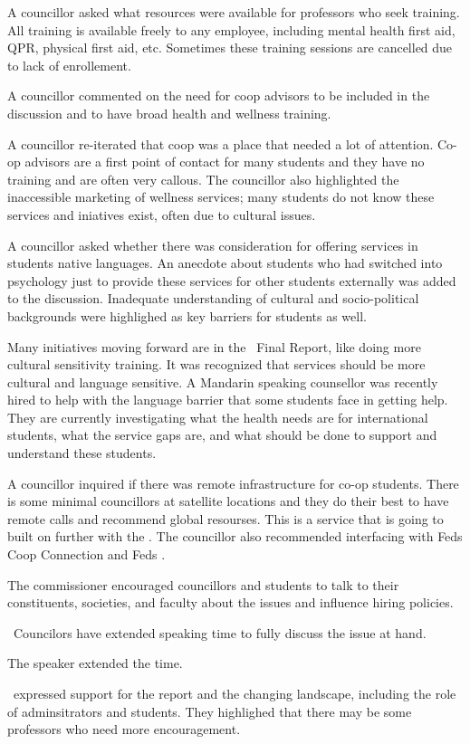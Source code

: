 \begin{information}
    A councillor asked what resources were available for professors who seek 
    training. All training is available freely to any employee, including
    mental health first aid, QPR, physical first aid, etc. Sometimes these 
    training sessions are cancelled due to lack of enrollement. 

    A councillor commented on the need for coop advisors to be included in 
    the discussion and to have broad health and wellness training. 

    A councillor re-iterated that coop was a place that needed a lot of
    attention. Co-op advisors are a first point of contact for many students
    and they have no training and are often very callous. The councillor also 
    highlighted the inaccessible marketing of wellness services; many students
    do not know these services and iniatives exist, often due to cultural
    issues.

    A councillor asked whether there was consideration for offering services in
    students native languages. An anecdote about students who had switched into
    psychology just to provide these services for other students externally was
    added to the discussion. Inadequate understanding of cultural and
    socio-political backgrounds were highlighed as key barriers for students as
    well. 

    Many initiatives moving forward are in the \pacsmh\ Final Report, like
    doing more cultural sensitivity training. It was recognized that services 
    should be more cultural and language sensitive. A Mandarin speaking
    counsellor was recently hired to help with the language barrier that some
    students face in getting help. They are currently investigating what the
    health needs are for international students, what the service gaps are,
    and what should be done to support and understand these students.

    A councillor inquired if there was remote infrastructure for co-op
    students. There is some minimal councillors at satellite locations and
    they do their best to have remote calls and recommend global resourses.
    This is a service that is going to built on further with the \pacsmh. The
    councillor also recommended interfacing with Feds Coop Connection and Feds
    \icsn. 

    The commissioner encouraged councillors and students to talk to their 
    constituents, societies, and faculty about the issues and influence hiring
    policies.

    \begin{motion}
        \birt\ Councilors have extended speaking time to fully discuss the 
        issue at hand.
        \movers{\seneca}{\rebecca}

        The speaker extended the time.
    \end{motion}

    \cai\ expressed support for the report and the changing landscape, 
    including the role of adminsitrators and students. They highlighed that 
    there may be some professors who need more encouragement.

\end{information}


